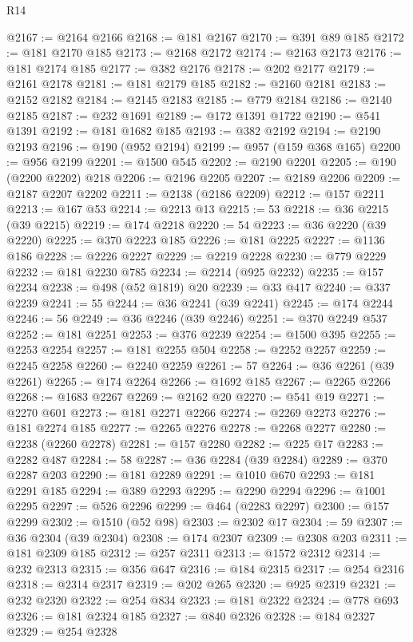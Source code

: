\begin{lexlean}{R14}
\begin{coremodule}
@2167 := @2164 @2166
@2168 := @181 @2167
@2170 := @391 @89 @185
@2172 := @181 @2170 @185
@2173 := @2168 @2172
@2174 := @2163 @2173
@2176 := @181 @2174 @185
@2177 := @382 @2176
@2178 := @202 @2177
@2179 := @2161 @2178
@2181 := @181 @2179 @185
@2182 := @2160 @2181
@2183 := @2152 @2182
@2184 := @2145 @2183
@2185 := @779 @2184
@2186 := @2140 @2185
@2187 := @232 @1691
@2189 := @172 @1391 @1722
@2190 := @541 @1391
@2192 := @181 @1682 @185
@2193 := @382 @2192
@2194 := @2190 @2193
@2196 := @190 (@952 @2194)
@2199 := @957 (@159 @368 @165)
@2200 := @956 @2199
@2201 := @1500 @545
@2202 := @2190 @2201
@2205 := @190 (@2200 @2202) @218
@2206 := @2196 @2205
@2207 := @2189 @2206
@2209 := @2187 @2207 @2202
@2211 := @2138 (@2186 @2209)
@2212 := @157 @2211
@2213 := @167 @53
@2214 := @2213 @13
@2215 := 53
@2218 := @36 @2215 (@39 @2215)
@2219 := @174 @2218
@2220 := 54
@2223 := @36 @2220 (@39 @2220)
@2225 := @370 @2223 @185
@2226 := @181 @2225
@2227 := @1136 @186
@2228 := @2226 @2227
@2229 := @2219 @2228
@2230 := @779 @2229
@2232 := @181 @2230 @785
@2234 := @2214 (@925 @2232)
@2235 := @157 @2234
@2238 := @498 (@52 @1819) @20
@2239 := @33 @417
@2240 := @337 @2239
@2241 := 55
@2244 := @36 @2241 (@39 @2241)
@2245 := @174 @2244
@2246 := 56
@2249 := @36 @2246 (@39 @2246)
@2251 := @370 @2249 @537
@2252 := @181 @2251
@2253 := @376 @2239
@2254 := @1500 @395
@2255 := @2253 @2254
@2257 := @181 @2255 @504
@2258 := @2252 @2257
@2259 := @2245 @2258
@2260 := @2240 @2259
@2261 := 57
@2264 := @36 @2261 (@39 @2261)
@2265 := @174 @2264
@2266 := @1692 @185
@2267 := @2265 @2266
@2268 := @1683 @2267
@2269 := @2162 @20
@2270 := @541 @19
@2271 := @2270 @601
@2273 := @181 @2271 @2266
@2274 := @2269 @2273
@2276 := @181 @2274 @185
@2277 := @2265 @2276
@2278 := @2268 @2277
@2280 := @2238 (@2260 @2278)
@2281 := @157 @2280
@2282 := @225 @17
@2283 := @2282 @487
@2284 := 58
@2287 := @36 @2284 (@39 @2284)
@2289 := @370 @2287 @203
@2290 := @181 @2289
@2291 := @1010 @670
@2293 := @181 @2291 @185
@2294 := @389 @2293
@2295 := @2290 @2294
@2296 := @1001 @2295
@2297 := @526 @2296
@2299 := @464 (@2283 @2297)
@2300 := @157 @2299
@2302 := @1510 (@52 @98)
@2303 := @2302 @17
@2304 := 59
@2307 := @36 @2304 (@39 @2304)
@2308 := @174 @2307
@2309 := @2308 @203
@2311 := @181 @2309 @185
@2312 := @257 @2311
@2313 := @1572 @2312
@2314 := @232 @2313
@2315 := @356 @647
@2316 := @184 @2315
@2317 := @254 @2316
@2318 := @2314 @2317
@2319 := @202 @265
@2320 := @925 @2319
@2321 := @232 @2320
@2322 := @254 @834
@2323 := @181 @2322
@2324 := @778 @693
@2326 := @181 @2324 @185
@2327 := @840 @2326
@2328 := @184 @2327
@2329 := @254 @2328

\end{coremodule}
\end{lexlean}
